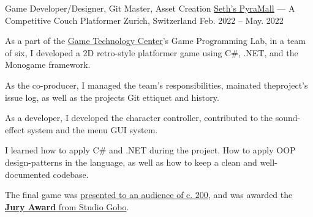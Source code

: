 

\begin{cventries}

    \cventry
    {Game Developer/Designer, Git Master, Asset Creation}
    {\href{https://www.youtube.com/watch?v=u3z3P-rHndg}{\uline{Seth's PyraMall}} --- A Competitive Couch Platformer}
    {Zurich, Switzerland}
    {Feb. 2022 -- May. 2022}
    {
        \begin{cvitems}
        \item As a part of the \href{https://gtc.inf.ethz.ch/education/game-programming-laboratory.html}{\uline{Game Technology Center}}'s Game Programming Lab, in a team of six, I developed a 2D retro-style platformer game using C\#, .NET, and the Monogame framework.
        \item As the co-producer, I managed the team's responsibilities, mainated theproject's issue log, as well as the projects Git ettiquet and history.
        \item As a developer, I developed the character controller, contributed to the sound-effect system and the menu GUI system.
        \item I learned how to apply C\# and .NET during the project. How to apply OOP design-patterns in the language, as well as how to keep a clean and well-documented codebase.
        \item The final game was \href{https://youtu.be/AuFtp9p35H4?t=1211}{presented to an audience of c. 200}, and was awarded the \href{https://youtu.be/AuFtp9p35H4?t=5614}{\textbf{\uline{Jury Award}} from Studio Gobo}.
        \end{cvitems}
    }


\end{cventries}

